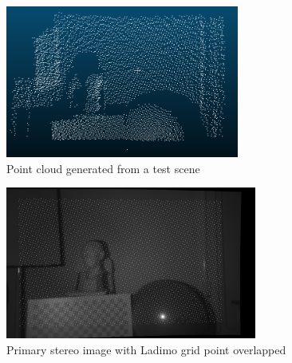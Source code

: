 \begin{figure}[t]
	\begin{center}
		\includegraphics[width=.8\textwidth, height=5cm, keepaspectratio]{images/point-cloud-example.png}
		\caption{Point cloud generated from a test scene}
		\label{fig:point-cloud-input}
	\end{center}
\end{figure}

\begin{figure}[t]
	\begin{center}
		\includegraphics[width=.8\textwidth, height=5cm, keepaspectratio]{images/stereo-rectified-rgb.png}
		\caption{Primary stereo image with Ladimo grid point overlapped}
		\label{fig:primary-stereo-input}
	\end{center}
\end{figure}

